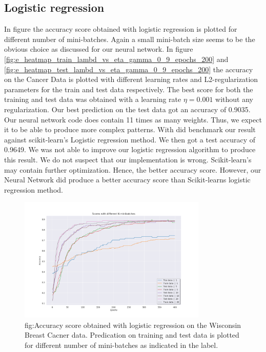 \subsection{Logistic regression}

In figure the accuracy score obtained with logistic regression is plotted for
different number of mini-batches. Again a small mini-batch size seems to be the
obvious choice as discussed for our neural network. In figure
\ref{fig:e_heatmap_train_lambd_vs_eta_gamma_0_9_epochs_200} and
\ref{fig:e_heatmap_test_lambd_vs_eta_gamma_0_9_epochs_200} the accuracy on the
Cancer Data is plotted with different learning rates and L2-regularization
parameters for the train and test data respectively. The best score for both
the training and test data was obtained with a learning rate $\eta = 0.001$
without any regularization. Our best prediction on the test data got an
accuracy of 0.9035. Our neural network code does contain 11 times as many
weights. Thus, we expect it to be able to produce more complex patterns. 
With did benchmark our result against scikit-learn's Logistic regression
method. We then got a test accuracy of  0.9649. We was not able to improve our
logistic regression algorithm to produce this result. We do not suspect that
our implementation is wrong. Scikit-learn's may contain further optimization.
Hence, the better accuracy score. However, our Neural Network did produce a
better accuracy score than Scikit-learns logistic regression method.

\begin{figure}[H]
    \centering
    \includegraphics[width=0.8\textwidth]{Figures/PartE/e_line_n_minibatches_gamma_0_9.png}
    \caption{fig:Accuracy score obtained with logistic regression on the
        Wisconsin Breast Cacner data. Predication on training and test data is
    plotted for different number of mini-batches as indicated in the label.}  
    \label{fig:e_line_n_minibatches_gamma_0_9} 

\end{figure}

